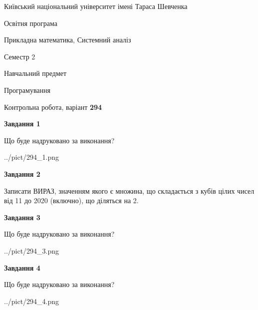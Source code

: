 \documentclass[12pt, ukrainian]{article}
\begin{document}
{{\begin {small}\par
{ \center  Київський національний університет імені Тараса Шевченка \par}
{\parbox {5 cm}{Освітня програма \hfill}{\parbox {8 cm}{Прикладна математика, Системний аналіз \hfill}}\parbox {5 cm}{\hfill Семестр 2}}\par
{\parbox {5 cm} {Навчальний предмет \hfill}\parbox {7 cm}{Програмування \hfill}\parbox {6cm}{\hfill}\par}\vspace{-7pt} \end{small}}{\center Контрольна робота, варіант  \No \textbf
{ 294 }\par}}
{
\begin {large}
{\begin {center}\textbf{Завдання 1}\end {center}}\par
Що буде надруковано за виконання?\par\par
\begin{center}
	{../pict/294_1.png}
\end{center}
\newpage

{\begin {center}\textbf{Завдання 2}\end {center}}\par
Записати ВИРАЗ, значенням якого є множина, що складається з кубів цілих чисел від 11 до 2020 (включно), що діляться на 2.\par
\newpage

{\begin {center}\textbf{Завдання 3}\end {center}}\par
Що буде надруковано за виконання?
\begin{center}
	{../pict/294_3.png}
\end{center}
\newpage

{\begin {center}\textbf{Завдання 4}\end {center}}\par
Що буде надруковано за виконання?\par
\begin{center}
	{../pict/294_4.png}
\end{center}
\newpage


\end{large}}
\end{document}
